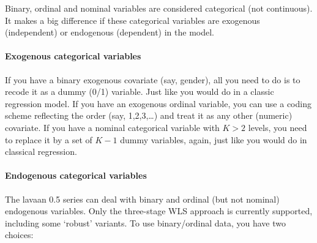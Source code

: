 Binary, ordinal and nominal variables are considered categorical (not
continuous). It makes a big difference if these categorical variables
are exogenous (independent) or endogenous (dependent) in the model.

\hypertarget{exogenous-categorical-variables}{%
\paragraph{Exogenous categorical
variables}\label{exogenous-categorical-variables}}

If you have a binary exogenous covariate (say, gender), all you need to
do is to recode it as a dummy (0/1) variable. Just like you would do in
a classic regression model. If you have an exogenous ordinal variable,
you can use a coding scheme reflecting the order (say, 1,2,3,\ldots{})
and treat it as any other (numeric) covariate. If you have a nominal
categorical variable with \(K > 2\) levels, you need to replace it by a
set of \(K-1\) dummy variables, again, just like you would do in
classical regression.

\hypertarget{endogenous-categorical-variables}{%
\paragraph{Endogenous categorical
variables}\label{endogenous-categorical-variables}}

The lavaan 0.5 series can deal with binary and ordinal (but not nominal)
endogenous variables. Only the three-stage WLS approach is currently
supported, including some `robust' variants. To use binary/ordinal data,
you have two choices:

